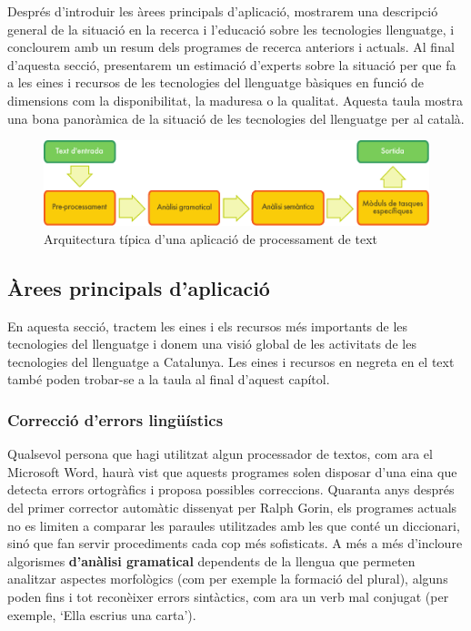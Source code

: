 \begin{multicols}{2}
Després d’introduir les àrees principals d’aplicació, mostrarem una descripció general de la situació en la recerca i l’educació sobre les tecnologies llenguatge, i conclourem amb un resum dels programes de recerca anteriors i actuals. Al final d’aquesta secció, presentarem un estimació d’experts sobre la situació per que fa a les eines i recursos de les tecnologies del llenguatge bàsiques en funció de dimensions com la disponibilitat, la maduresa o la qualitat. Aquesta taula mostra una bona panoràmica de la situació de les tecnologies del llenguatge per al català.  

\begin{figure}[htb]
  \center
  \includegraphics[width=\textwidth]{../_media/catalan/text_processing_app_architecture}
  \caption{Arquitectura típica d'una aplicació de processament de text}
  \label{fig:textprocessingarch_ca}
\end{figure}

\subsection{Àrees principals d’aplicació} 

En aquesta secció, tractem les eines i els recursos més importants de les tecnologies del llenguatge i donem una visió global de les activitats de les tecnologies del llenguatge a Catalunya. Les eines i recursos en negreta en el text també poden trobar-se a la taula al final d'aquest capítol.

\subsubsection{Correcció d’errors lingüístics}

Qualsevol persona que hagi utilitzat algun processador de textos, com ara el Microsoft Word, haurà vist que aquests programes solen disposar d’una eina que detecta errors ortogràfics i proposa possibles correccions. Quaranta anys després del primer corrector automàtic dissenyat per Ralph Gorin, els programes actuals no es limiten a comparar les paraules utilitzades amb les que conté un diccionari, sinó que fan servir procediments cada cop més sofisticats. A més a més d’incloure algorismes \textbf{d'anàlisi gramatical} dependents de la llengua que permeten analitzar aspectes morfològics (com per exemple la formació del plural), alguns poden fins i tot reconèixer errors sintàctics, com ara un verb mal conjugat (per exemple, ‘Ella escrius una carta’).


\end{multicols}
